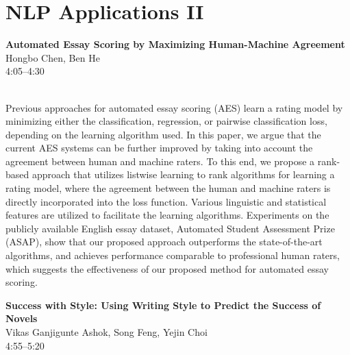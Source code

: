 \documentclass[twoside,makeidx]{book}
\begin{document}
\section{NLP Applications II}
\vspace{-1em}
\par\vspace{2em}\noindent%
\begin{minipage}{\linewidth}%
\begin{center}
\textbf{\normalsize Automated Essay Scoring by Maximizing Human-Machine Agreement}\\
\normalsize  Hongbo Chen,  Ben He\\
{\small 4:05--4:30}\\
\end{center}
\end{minipage}\\[0.5em]
\nopagebreak%
\noindent%
{\small Previous approaches for automated essay scoring (AES) learn a rating model by minimizing either the classification, regression, or pairwise classification loss, depending on the learning algorithm used. In this paper, we argue that the current AES systems can be further improved by taking into account the agreement between human and machine raters. To this end, we propose a rank-based approach that utilizes listwise learning to rank algorithms for learning a rating model, where the agreement between the human and machine raters is directly incorporated into the loss function. Various linguistic and statistical features are utilized to facilitate the learning algorithms. Experiments on the publicly available English essay dataset, Automated Student Assessment Prize (ASAP), show that our proposed approach outperforms the state-of-the-art algorithms, and achieves performance comparable to professional human raters, which suggests the effectiveness of our proposed method for automated essay scoring.}
\par\vspace{2em}\noindent%
\begin{minipage}{\linewidth}%
\begin{center}
\textbf{\normalsize Success with Style: Using Writing Style to Predict the Success of Novels}\\
\normalsize  Vikas Ganjigunte Ashok,  Song Feng,  Yejin Choi\\
{\small 4:55--5:20}\\
\end{center}
\end{minipage}\\[0.5em]
\end{document}
